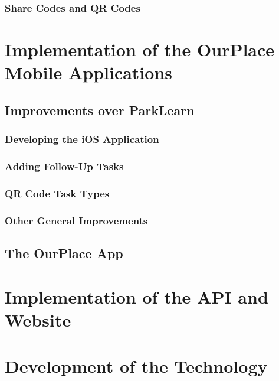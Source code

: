 \subsubsection{Share Codes and QR Codes}

\section{Implementation of the OurPlace Mobile Applications}
\label{sec:ImplementationMobile}

\subsection{Improvements over ParkLearn}

\subsubsection{Developing the iOS Application}

\subsubsection{Adding Follow-Up Tasks}

\subsubsection{QR Code Task Types}

\subsubsection{Other General Improvements}


\subsection{The OurPlace App}

\section{Implementation of the API and Website}
\label{sec:ImplementationWeb}

\section{Development of the Technology}

